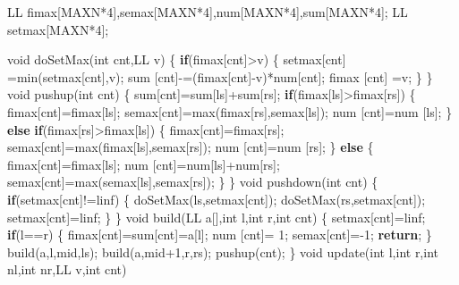 \documentclass[
]{article}
\newenvironment{Shaded}{}{}
\newcommand{\ControlFlowTok}[1]{\textcolor[rgb]{0.00,0.44,0.13}{\textbf{#1}}}
\newcommand{\DataTypeTok}[1]{\textcolor[rgb]{0.56,0.13,0.00}{#1}}
\newcommand{\DecValTok}[1]{\textcolor[rgb]{0.25,0.63,0.44}{#1}}
\newcommand{\NormalTok}[1]{#1}
\begin{document}
\begin{Shaded}
\begin{Highlighting}[]
\NormalTok{LL fimax[MAXN*}\DecValTok{4}\NormalTok{],semax[MAXN*}\DecValTok{4}\NormalTok{],num[MAXN*}\DecValTok{4}\NormalTok{],sum[MAXN*}\DecValTok{4}\NormalTok{];}
\NormalTok{LL setmax[MAXN*}\DecValTok{4}\NormalTok{];}

\DataTypeTok{void}\NormalTok{ doSetMax(}\DataTypeTok{int}\NormalTok{ cnt,LL v)}
\NormalTok{\{}
    \ControlFlowTok{if}\NormalTok{(fimax[cnt]\textgreater{}v)}
\NormalTok{    \{}
\NormalTok{        setmax[cnt] =min(setmax[cnt],v);}
\NormalTok{        sum   [cnt]{-}=(fimax[cnt]{-}v)*num[cnt];}
\NormalTok{        fimax [cnt] =v;}
\NormalTok{    \}}
\NormalTok{\}}
\DataTypeTok{void}\NormalTok{ pushup(}\DataTypeTok{int}\NormalTok{ cnt)}
\NormalTok{\{}
\NormalTok{    sum[cnt]=sum[ls]+sum[rs];}
    \ControlFlowTok{if}\NormalTok{(fimax[ls]\textgreater{}fimax[rs])}
\NormalTok{    \{}
\NormalTok{        fimax[cnt]=fimax[ls];}
\NormalTok{        semax[cnt]=max(fimax[rs],semax[ls]);}
\NormalTok{        num  [cnt]=num  [ls];}
\NormalTok{    \}}
    \ControlFlowTok{else} \ControlFlowTok{if}\NormalTok{(fimax[rs]\textgreater{}fimax[ls])}
\NormalTok{    \{}
\NormalTok{        fimax[cnt]=fimax[rs];}
\NormalTok{        semax[cnt]=max(fimax[ls],semax[rs]);}
\NormalTok{        num  [cnt]=num  [rs];}
\NormalTok{    \}}
    \ControlFlowTok{else}
\NormalTok{    \{}
\NormalTok{        fimax[cnt]=fimax[ls];}
\NormalTok{        num  [cnt]=num[ls]+num[rs];}
\NormalTok{        semax[cnt]=max(semax[ls],semax[rs]);}
\NormalTok{    \}}
\NormalTok{\}}
\DataTypeTok{void}\NormalTok{ pushdown(}\DataTypeTok{int}\NormalTok{ cnt)}
\NormalTok{\{}
    \ControlFlowTok{if}\NormalTok{(setmax[cnt]!=linf)}
\NormalTok{    \{}
\NormalTok{        doSetMax(ls,setmax[cnt]);}
\NormalTok{        doSetMax(rs,setmax[cnt]);}
\NormalTok{        setmax[cnt]=linf;}
\NormalTok{    \}}
\NormalTok{\}}
\DataTypeTok{void}\NormalTok{ build(LL a[],}\DataTypeTok{int}\NormalTok{ l,}\DataTypeTok{int}\NormalTok{ r,}\DataTypeTok{int}\NormalTok{ cnt)}
\NormalTok{\{}
\NormalTok{    setmax[cnt]=linf;}
    \ControlFlowTok{if}\NormalTok{(l==r)}
\NormalTok{    \{}
\NormalTok{        fimax[cnt]=sum[cnt]=a[l];}
\NormalTok{        num  [cnt]= }\DecValTok{1}\NormalTok{;}
\NormalTok{        semax[cnt]={-}}\DecValTok{1}\NormalTok{;}
        \ControlFlowTok{return}\NormalTok{;}
\NormalTok{    \}}
\NormalTok{    build(a,l,mid,ls);}
\NormalTok{    build(a,mid+}\DecValTok{1}\NormalTok{,r,rs);}
\NormalTok{    pushup(cnt);}
\NormalTok{\}}
\DataTypeTok{void}\NormalTok{ update(}\DataTypeTok{int}\NormalTok{ l,}\DataTypeTok{int}\NormalTok{ r,}\DataTypeTok{int}\NormalTok{ nl,}\DataTypeTok{int}\NormalTok{ nr,LL v,}\DataTypeTok{int}\NormalTok{ cnt)}

\end{Highlighting}
\end{Shaded}
\end{document}
